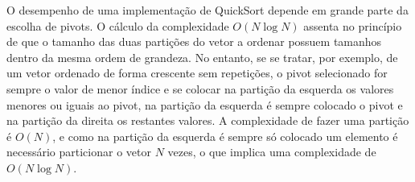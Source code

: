 O desempenho de uma implementação de QuickSort depende em grande parte da escolha de pivots. O cálculo da complexidade $O(N\log N)$ assenta no princípio de que o tamanho das duas partições do vetor a ordenar possuem tamanhos dentro da mesma ordem de grandeza. No entanto, se se tratar, por exemplo, de um vetor ordenado de forma crescente sem repetições, o pivot selecionado for sempre o valor de menor índice e se colocar na partição da esquerda os valores menores ou iguais ao pivot, na partição da esquerda é sempre colocado o pivot e na partição da direita os restantes valores. A complexidade de fazer uma partição é $O(N)$, e como na partição da esquerda é sempre só colocado um elemento é necessário particionar o vetor $N$ vezes, o que implica uma complexidade de $O(N\log N)$.
